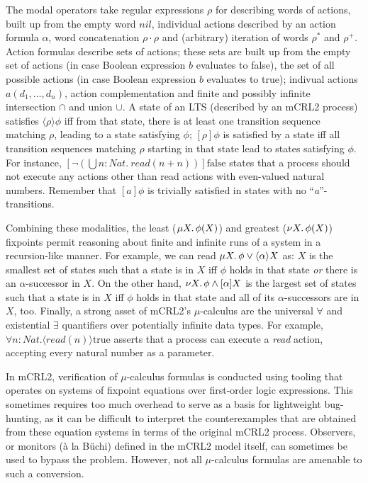 \documentclass[letter]{llncs}
\begin{document}
The modal operators take regular expressions
$\rho$ for describing words of actions, built up from the empty word $nil$, individual
actions described by an action formula $\alpha$, word
concatenation $\rho \cdot \rho$ and (arbitrary) iteration of words $\rho^*$ and $\rho^+$.
Action formulas describe sets of actions; these sets are built up from the empty
set of actions (in case Boolean expression $b$ evaluates to false), the set of all possible actions
(in case Boolean expression $b$ evaluates to true); indivual actions $a(d_1,\dots,d_n)$, 
action complementation and finite and possibly infinite intersection $\cap$ and union $\cup$.
A state of an LTS (described by an mCRL2 process) satisfies $\langle \rho \rangle \phi$
iff from that state, there is at least one transition sequence matching $\rho$,
leading to a state satisfying $\phi$;
$[\rho]\phi$ is satisfied by a state iff all transition sequences matching $\rho$ starting in that 
state lead to states satisfying $\phi$.
For instance, $[\neg (\bigcup{n{:}Nat}.~
\textit{read}(n+n))]\text{false}$ states that a process should not execute any actions
other than read actions with even-valued natural numbers.
Remember that $[a]\phi$ is trivially satisfied in states with no ``\emph{a}''-transitions.

Combining these modalities, the least ($\mu X\ldotp \phi(X)$) and
greatest ($\nu X\ldotp \phi(X)$) fixpoints permit reasoning about finite
and infinite runs of a system in a recursion-like manner.  For example,
we can read $\mu X\ldotp\phi\vee\langle\alpha\rangle X$ as: $X$ is
the smallest set of states such that a state is in $X$ iff $\phi$
holds in that state \emph{or} there is an $\alpha$-successor in $X$.
On the other hand, $\nu X\ldotp\phi \wedge[\alpha]X$ is the largest
set of states such that a state is in $X$ iff $\phi$ holds in that
state and all of its $\alpha$-successors are in $X$, too.  Finally, a
strong asset of mCRL2's $\mu$-calculus are the universal $\forall$ and
existential $\exists$ quantifiers over potentially infinite data types.
For example, $\forall n{:}Nat. \langle \textit{read}(n) \rangle \text{true}$
asserts that a process can execute a \emph{read} action, accepting every
natural number as a parameter.

In mCRL2, verification of $\mu$-calculus formulas is conducted using tooling that operates
on systems of fixpoint equations over first-order logic expressions.
This sometimes requires too much overhead to serve as a basis for lightweight 
bug-hunting, as it can be difficult to interpret the counterexamples that are obtained from
these equation systems in terms of the original mCRL2 process.
Observers, or monitors (\`{a} la B\"uchi) defined in the mCRL2 model itself, can sometimes
be used to bypass the problem.
However, not all $\mu$-calculus formulas are amenable to such a conversion.
\end{document}
